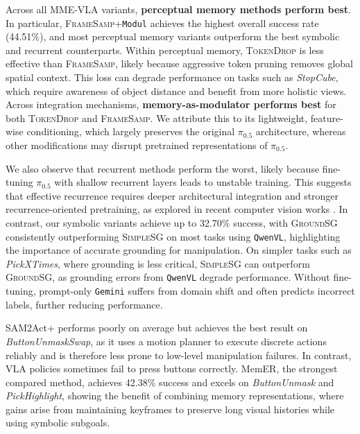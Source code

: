 Across all MME-VLA variants, \textbf{perceptual memory methods perform best}. In particular, \textsc{FrameSamp}+\texttt{Modul} achieves the highest overall success rate (44.51\%), and most perceptual memory variants outperform the best symbolic and recurrent counterparts. Within perceptual memory, \textsc{TokenDrop} is less effective than \textsc{FrameSamp}, likely because aggressive token pruning removes global spatial context. This loss can degrade performance on tasks such as \textit{StopCube}, which require awareness of object distance and benefit from more holistic views.
Across integration mechanisms, \textbf{memory-as-modulator performs best} for both \textsc{TokenDrop} and \textsc{FrameSamp}. We attribute this to its lightweight, feature-wise conditioning, which largely preserves the original $\pi_{0.5}$ architecture, whereas other   modifications may disrupt pretrained representations of $\pi_{0.5}$.

We also observe that recurrent methods perform the worst, likely because fine-tuning $\pi_{0.5}$ with shallow recurrent layers leads to unstable training. This suggests that effective recurrence requires deeper architectural integration and stronger recurrence-oriented pretraining, as explored in recent computer vision works \cite{zhang2025test, wang2026tttlrm}.
In contrast, our symbolic variants achieve up to 32.70\% success, with \textsc{GroundSG} consistently outperforming \textsc{SimpleSG} on most tasks using \texttt{QwenVL}, highlighting the importance of accurate grounding for manipulation.
On simpler tasks such as \textit{PickXTimes}, where grounding is less critical, \textsc{SimpleSG} can outperform \textsc{GroundSG}, as grounding errors from \texttt{QwenVL} degrade performance.
Without fine-tuning, prompt-only \texttt{Gemini} suffers from domain shift and often predicts incorrect labels, further reducing performance.

SAM2Act+ performs poorly on average but achieves the best result on \textit{ButtonUnmaskSwap}, as it uses a motion planner to execute discrete actions reliably and is therefore less prone to low-level manipulation failures.
In contrast, VLA policies sometimes fail to press buttons correctly.
MemER, the strongest compared method, achieves 42.38\% success and excels on \textit{ButtonUnmask} and \textit{PickHighlight}, showing the benefit of combining  memory representations, where gains arise from maintaining keyframes to preserve long visual histories while using symbolic subgoals.


